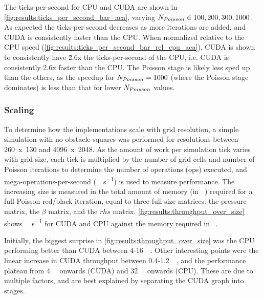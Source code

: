 The ticks-per-second for CPU and CUDA are shown in \cref{fig:results:ticks_per_second_bar_aca}, varying $N_{Poisson} \in {100, 200, 300, 1000}$.
As expected the ticks-per-second decreases as more iterations are added, and CUDA is consistently faster than the CPU.
When normalized relative to the CPU speed (\cref{fig:results:ticks_per_second_bar_rel_cpu_aca}), CUDA is shown to consistently have \~2.6x the ticks-per-second of the CPU, i.e. CUDA is consistently 2.6x faster than the CPU. 
The Poisson stage is likely less sped up than the others, as the speedup for $N_{Poisson}{} = 1000$ (where the Poisson stage dominates) is less than that for lower $N_{Poisson}{}$ values.

\subsubsection{Scaling}
To determine how the implementations scale with grid resolution, a simple simulation with no obstacle squares was performed for resolutions between 260~x~130 and 4096~x~2048.
As the amount of work per simulation tick varies with grid size, each tick is multiplied by the number of grid cells and number of Poisson iterations to determine the number of operations (\si{op}s) executed, and  mega-operations-per-second (\si{\mega\op\per\second}) is used to measure performance.
The increasing size is measured in the total amount of memory (in \si{\mega\byte}) required for a full Poisson red/black iteration, equal to three full size matrices: the pressure matrix, the $\beta$ matrix, and the $rhs$ matrix.
\cref{fig:results:throughput_over_size} shows \si{\mega\op\per\second} for CUDA and CPU against the memory required in \si{\mega\byte}.



Initially, the biggest surprise in \cref{fig:results:throughput_over_size} was the CPU performing better than CUDA between 4-\SI{16}{\mega\byte}.
Other interesting points were the linear increase in CUDA throughput between 0.4-\SI{1.2}{\mega\byte}, and the performance plateau from \SI{4}{\mega\byte} onwards (CUDA) and \SI{32}{\mega\byte} onwards (CPU).
These are due to multiple factors, and are best explained by separating the CUDA graph into stages.

